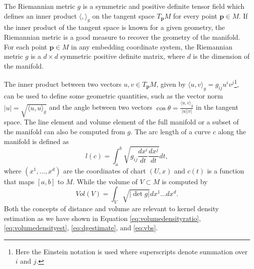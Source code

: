 \documentclass[11pt,a4paper,]{article}
\begin{document}
The Riemannian metric \(g\) is a symmetric and positive definite tensor field which defines an inner product \(\langle,\rangle_g\) on the tangent space \(T_{\pmb{p}} M\) for every point \(\pmb{p} \in M\). If the inner product of the tangent space is known for a given geometry, the Riemannian metric is a good measure to recover the geometry of the manifold. For each point \(\pmb{p} \in M\) in any embedding coordinate system, the Riemannian metric \(g\) is a \(d\times d\) symmetric positive definite matrix, where \(d\) is the dimension of the manifold.

The inner product between two vectors \(u,v \in T_{\pmb{p}}M\), given by \(\langle u,v \rangle_g=g_{ij}u^iv^j\)\footnote{Here the Einstein notation is used where superscripts denote summation over \(i\) and \(j\).}, can be used to define some geometric quantities, such as the vector norm \(|u|=\sqrt{\langle u,u \rangle_g}\) and the angle between two vectors \(\cos{\theta}=\frac{\langle u,v \rangle_g}{|u| |v|}\) in the tangent space.
The line element and volume element of the full manifold or a subset of the manifold can also be computed from \(g\). The arc length of a curve \(c\) along the manifold is defined as
\[
l(c)=\int_a^b \sqrt{g_{ij} \frac{dx^i}{dt} \frac{dx^j}{dt}} dt,
\]
where \((x^1,\dots,x^d)\) are the coordinates of chart \((U,x)\) and \(c(t)\) is a function that maps \([a,b]\) to \(M\). While the volume of \(V\subset M\) is computed by
\[
Vol(V)=\int_V \sqrt{|\det g|} dx^1\dots dx^d.
\]
Both the concepts of distance and volume are relevant to kernel density estimation as we have shown in Equation \eqref{eq:volumedensityratio}, \eqref{eq:volumedensityest}, \eqref{eq:dgestimate}, and \eqref{eq:vbs}.
\end{document}
